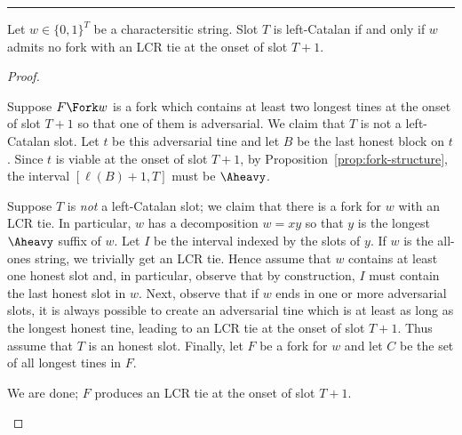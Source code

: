 \hrule



      \begin{theorem}\label{thm:lcr-tie-left-catalan}
        Let $w \in \{0,1\}^T$ be a charactersitic string. 
        Slot $T$ is left-Catalan 
        if and only if 
        $w$ admits no fork with an LCR tie at the onset of slot $T + 1$.
      \end{theorem}
      \begin{proof}
        ~
        \begin{description}[font=\normalfont\itshape\space]
          \item[Forward direction.]
          Suppose $F \Fork w$ is a fork which contains 
          at least two longest tines at the onset of slot $T + 1$ so that 
          one of them is adversarial. 
          We claim that $T$ is not a left-Catalan slot.
          Let $t$ be this adversarial tine and  
          let $B$ be the last honest block on $t$. 
          Since $t$ is viable at the onset of slot $T + 1$, 
          by Proposition~\ref{prop:fork-structure}, 
          the interval $[\ell(B) + 1, T]$ must be $\Aheavy$. 



          \item[Reverse direction.]
          Suppose $T$ is \emph{not} a left-Catalan slot; 
          we claim that there is a fork for $w$ with an LCR tie.
          In particular, $w$ has a decomposition $w = xy$ so that 
          $y$ is the longest $\Aheavy$ suffix of $w$. 
          Let $I$ be the interval indexed by the slots of $y$.
          If $w$ is the all-ones string, we trivially get an LCR tie. 
          Hence assume that $w$ contains at least one honest slot and, 
          in particular, 
          observe that by construction, 
          $I$ must contain the last honest slot in $w$. 
          Next, observe that if $w$ ends in one or more adversarial slots, 
          it is always possible to create an adversarial tine which is 
          at least as long as the longest honest tine, 
          leading to an LCR tie at the onset of slot $T + 1$. 
          Thus assume that $T$ is an honest slot.
          Finally, let $F$ be a fork for $w$ 
          and let $C$ be the set of all longest tines in $F$.

          \begin{description}[font=\normalfont\itshape\space]
            \item[If $|C| \geq 2$ and $C$ contains an adversarial tine:]
            We are done; $F$ produces an LCR tie at the onset of slot $T + 1$.


\end{description}
\end{description}
\end{proof}
